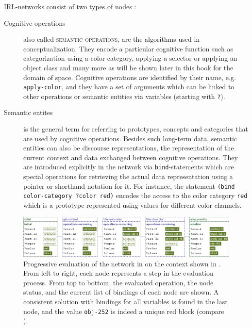 \noindent IRL-networks consist of two types of nodes :
\begin{description}
\item[Cognitive operations] also called \textsc{semantic operations},
are the algorithms used in conceptualization. They encode a particular cognitive 
function such as categorization using a color category,
applying a selector or applying an object class and many more as will be shown
later in this book for the domain of space. Cognitive operations 
are identified by their name, e.g. {\footnotesize\tt apply-color}, and
they have a set of arguments which can be linked to other operations
or semantic entities via variables (starting with {\footnotesize\tt ?}).
\item[Semantic entites] is the general term for referring to prototypes,
concepts and categories that are used by cognitive operations.
Besides such long-term data, semantic entities can also be
discourse representations, the representation of the current context
and data exchanged between cognitive operations. They
are introduced explicitly in the network via {\footnotesize\tt bind}-statements
which are special operations for retrieving the actual data representation
using a pointer or shorthand notation for it. For instance, 
the statement {\footnotesize\tt (bind color-category ?color red)}
encodes the access to the color category {\footnotesize\tt red} which
is a prototype represented using values for different color channels.
\end{description}


\begin{figure}
\center
\includegraphics[width=\textwidth]{figs/evaluation-tree}
\caption[Evaluation of an IRL-network]{Progressive evaluation 
of the network in 
on the context shown in .
From left to right, each node represents a step in the evaluation process. From top to bottom, the evaluated operation, the node status, and the current list of bindings of each node are shown. A consistent solution with bindings for all variables is found in the last node, and the value 
{\footnotesize\tt obj-252} is indeed a unique red block (compare ).}
\label{f:evaluation-tree}
\end{figure}

